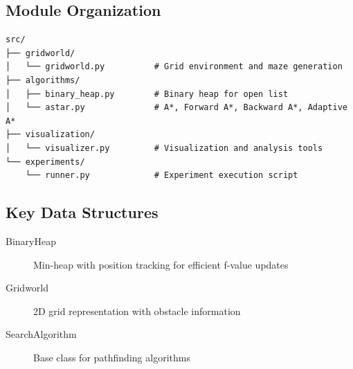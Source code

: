 \documentclass[12pt]{article}
\begin{document}
\subsection{Module Organization}

\begin{verbatim}
src/
├── gridworld/
│   └── gridworld.py          # Grid environment and maze generation
├── algorithms/
│   ├── binary_heap.py        # Binary heap for open list
│   └── astar.py              # A*, Forward A*, Backward A*, Adaptive A*
├── visualization/
│   └── visualizer.py         # Visualization and analysis tools
└── experiments/
    └── runner.py             # Experiment execution script
\end{verbatim}

\subsection{Key Data Structures}

\begin{description}
    \item[BinaryHeap] Min-heap with position tracking for efficient f-value updates
    \item[Gridworld] 2D grid representation with obstacle information
    \item[SearchAlgorithm] Base class for pathfinding algorithms
\end{description}
\end{document}
